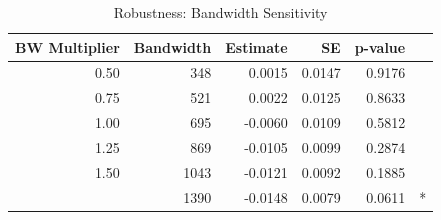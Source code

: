\begin{table}[!h]
\centering
\caption{\label{tab:bandwidth}Robustness: Bandwidth Sensitivity}
\centering
\begin{tabular}[t]{rrrrrl}
\toprule
BW Multiplier & Bandwidth & Estimate & SE & p-value & \\
\midrule
0.50 & 348 & 0.0015 & 0.0147 & 0.9176 & \\
0.75 & 521 & 0.0022 & 0.0125 & 0.8633 & \\
1.00 & 695 & -0.0060 & 0.0109 & 0.5812 & \\
1.25 & 869 & -0.0105 & 0.0099 & 0.2874 & \\
1.50 & 1043 & -0.0121 & 0.0092 & 0.1885 & \\
\addlinespace
2.00 & 1390 & -0.0148 & 0.0079 & 0.0611 & *\\
\bottomrule
\end{tabular}
\end{table}
